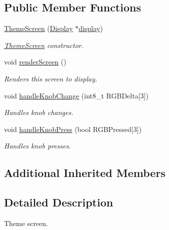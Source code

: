 \subsection*{Public Member Functions}
\begin{DoxyCompactItemize}
\item 
\mbox{\hyperlink{classThemeScreen_af62f34712361648223d8355ac9cbeb1a}{Theme\+Screen}} (\mbox{\hyperlink{classDisplay}{Display}} $\ast$\mbox{\hyperlink{classScreen_aad713267725e8aa8a8def951a07de641}{display}})
\begin{DoxyCompactList}\small\item\em \mbox{\hyperlink{classThemeScreen}{Theme\+Screen}} constructor. \end{DoxyCompactList}\item 
\mbox{\label{classThemeScreen_a7ce31eea7316cdf3f9b7769e3df6ff7f}} 
void \mbox{\hyperlink{classThemeScreen_a7ce31eea7316cdf3f9b7769e3df6ff7f}{render\+Screen}} ()
\begin{DoxyCompactList}\small\item\em Renders this screen to display. \end{DoxyCompactList}\item 
\mbox{\label{classThemeScreen_a63186eef43267b259663c811f457ae55}} 
void \mbox{\hyperlink{classThemeScreen_a63186eef43267b259663c811f457ae55}{handle\+Knob\+Change}} (int8\+\_\+t R\+G\+B\+Delta\mbox{[}3\mbox{]})
\begin{DoxyCompactList}\small\item\em Handles knob changes. \end{DoxyCompactList}\item 
\mbox{\label{classThemeScreen_ae497f8c5fda0250abcade2603ea3b3be}} 
void \mbox{\hyperlink{classThemeScreen_ae497f8c5fda0250abcade2603ea3b3be}{handle\+Knob\+Press}} (bool R\+G\+B\+Pressed\mbox{[}3\mbox{]})
\begin{DoxyCompactList}\small\item\em Handles knob presses. \end{DoxyCompactList}\end{DoxyCompactItemize}
\subsection*{Additional Inherited Members}


\subsection{Detailed Description}
Theme screen. 

